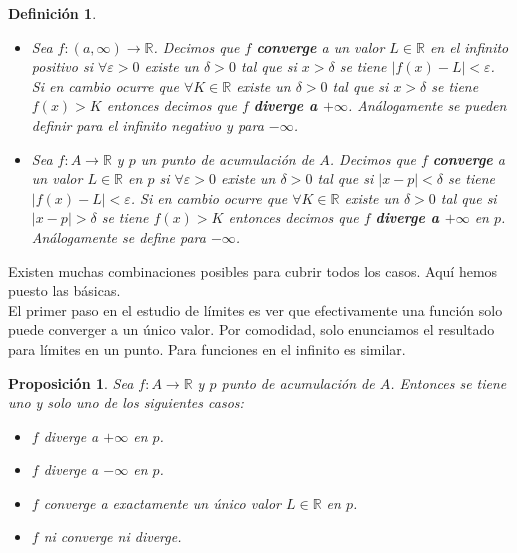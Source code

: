 \documentclass{article}
\newtheorem{prop}{Proposición}
\newtheorem{define}{Definición}
\newcommand{\reales}{\mathbb{R}}
\begin{document}
\begin{define}
	\begin{itemize}
		\item
		Sea $f: (a, \infty) \rightarrow \reales$. Decimos que $f$ \textbf{converge} a un valor $L\in \reales$ en el infinito positivo si $\forall \varepsilon > 0$ existe un $\delta > 0$ tal que si $x > \delta$ se tiene $|f(x) - L| < \varepsilon$. Si en cambio ocurre que $\forall K \in \reales$ existe un $\delta > 0$ tal que si $x > \delta$ se tiene $f(x) > K$ entonces decimos que $f$ \textbf{diverge a $+\infty$}. Análogamente se pueden definir para el infinito negativo y para $-\infty$.
		\item
		Sea $f: A \rightarrow \reales$ y $p$ un punto de acumulación de $A$. Decimos que $f$ \textbf{converge} a un valor $L\in \reales$ en $p$ si $\forall \varepsilon > 0$ existe un $\delta > 0$ tal que si $|x - p| < \delta$ se tiene $|f(x) - L| < \varepsilon$. Si en cambio ocurre que $\forall K \in \reales$ existe un $\delta > 0$ tal que si $|x - p| > \delta$ se tiene $f(x) > K$ entonces decimos que $f$ \textbf{diverge a $+\infty$} en $p$. Análogamente se define para $-\infty$.
	\end{itemize}
\end{define}

Existen muchas combinaciones posibles para cubrir todos los casos. Aquí hemos puesto las básicas.\\ 
El primer paso en el estudio de límites es ver que efectivamente una función solo puede converger a un único valor. Por comodidad, solo enunciamos el resultado para límites en un punto. Para funciones en el infinito es similar.

\begin{prop}
	Sea $f: A \rightarrow \reales$ y $p$ punto de acumulación de $A$. Entonces se tiene uno y solo uno de los siguientes casos:
	\begin{itemize}
		\item
		$f$ diverge a $+\infty$ en $p$.
		
		\item
		$f$ diverge a $-\infty$ en $p$.
		
		\item
		$f$ converge a exactamente un único valor $L \in \reales$ en $p$.
		
		\item
		$f$ ni converge ni diverge.
	\end{itemize}
\end{prop}
\end{document}
